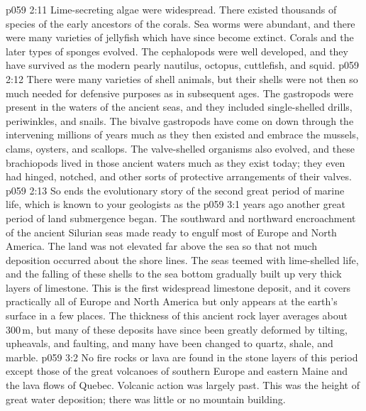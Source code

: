 \vs p059 2:11 Lime\hyp{}secreting algae were widespread. There existed thousands of species of the early ancestors of the corals. Sea worms were abundant, and there were many varieties of jellyfish which have since become extinct. Corals and the later types of sponges evolved. The cephalopods were well developed, and they have survived as the modern pearly nautilus, octopus, cuttlefish, and squid.
\vs p059 2:12 There were many varieties of shell animals, but their shells were not then so much needed for defensive purposes as in subsequent ages. The gastropods were present in the waters of the ancient seas, and they included single\hyp{}shelled drills, periwinkles, and snails. The bivalve gastropods have come on down through the intervening millions of years much as they then existed and embrace the mussels, clams, oysters, and scallops. The valve\hyp{}shelled organisms also evolved, and these brachiopods lived in those ancient waters much as they exist today; they even had hinged, notched, and other sorts of protective arrangements of their valves.
\vs p059 2:13 \pc So ends the evolutionary story of the second great period of marine life, which is known to your geologists as the 
\vs p059 3:1  years ago another great period of land submergence began. The southward and northward encroachment of the ancient Silurian seas made ready to engulf most of Europe and North America. The land was not elevated far above the sea so that not much deposition occurred about the shore lines. The seas teemed with lime\hyp{}shelled life, and the falling of these shells to the sea bottom gradually built up very thick layers of limestone. This is the first widespread limestone deposit, and it covers practically all of Europe and North America but only appears at the earth’s surface in a few places. The thickness of this ancient rock layer averages about 300\,m, but many of these deposits have since been greatly deformed by tilting, upheavals, and faulting, and many have been changed to quartz, shale, and marble.
\vs p059 3:2 No fire rocks or lava are found in the stone layers of this period except those of the great volcanoes of southern Europe and eastern Maine and the lava flows of Quebec. Volcanic action was largely past. This was the height of great water deposition; there was little or no mountain building.
